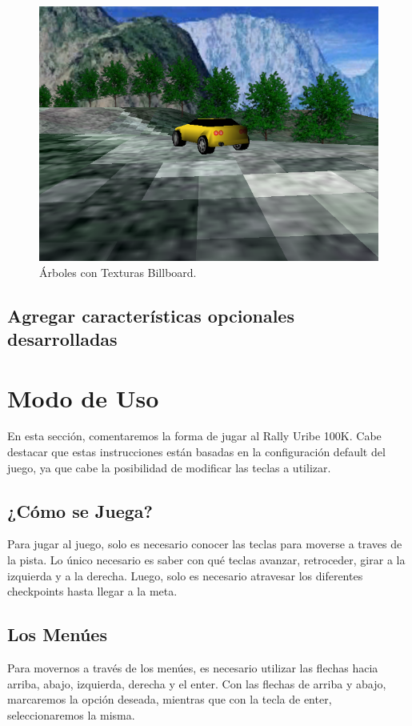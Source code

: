 \documentclass[a4paper,11pt]{article}
\begin{document}
\begin{figure}
 \centering
 \includegraphics[scale=0.4]{./billboard.png}
 \caption{Árboles con Texturas Billboard.}
 \label{fig:figure7}
\end{figure}


\subsection{Agregar características opcionales desarrolladas}

\section{Modo de Uso}
\label{mododeuso}
En esta sección, comentaremos la forma de jugar al Rally Uribe 100K.  Cabe
destacar que estas instrucciones están basadas en la configuración default del
juego, ya que cabe la posibilidad de modificar las teclas a utilizar.

\subsection{¿Cómo se Juega?}
Para jugar al juego, solo es necesario conocer las teclas para moverse a traves
de la pista.  Lo único necesario es saber con qué teclas avanzar, retroceder,
girar a la izquierda y a la derecha.  Luego, solo es necesario atravesar los
diferentes checkpoints hasta llegar a la meta.

\subsection{Los Menúes}
Para movernos a través de los menúes, es necesario utilizar las flechas hacia
arriba, abajo, izquierda, derecha y el enter.  Con las flechas de arriba y
abajo, marcaremos la opción deseada, mientras que con la tecla de enter,
seleccionaremos la misma.
\end{document}
